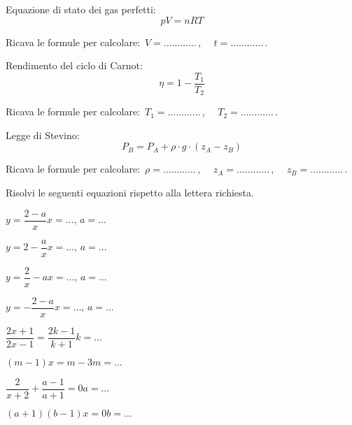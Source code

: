 \begin{esercizio}
\label{ese:20.65}
Equazione di stato dei gas perfetti:
\begin{equation*}
  pV=nRT
\end{equation*}

Ricava le formule per calcolare:~$V=\ldots\ldots\ldots\ldots$\,, $\quad 
t=\ldots\ldots\ldots\ldots$\,.
\end{esercizio}

\begin{esercizio}
\label{ese:20.66}
Rendimento del ciclo di Carnot:
\begin{equation*}
  \eta =1-\dfrac{T_{1}}{T_{2}}
\end{equation*}

Ricava le formule per calcolare:~$T_1=\ldots\ldots\ldots\ldots$\,, $\quad 
T_2=\ldots\ldots\ldots\ldots$\,.
\end{esercizio}

\begin{esercizio}
\label{ese:20.67}
Legge di Stevino:
\begin{equation*}
  P_{B}=P_{A}+\rho \cdot g\cdot (z_{A}-z_{B})
\end{equation*}

Ricava le formule per calcolare:~$\rho=\ldots\ldots\ldots\ldots$\,, $\quad 
z_A=\ldots\ldots\ldots\ldots$\,, $\quad z_B =\ldots\ldots\ldots\ldots$\,.
\end{esercizio}

\begin{esercizio}
\label{ese:20.68}
Risolvi le seguenti equazioni rispetto alla lettera richiesta.
\begin{multicols}{2}
\TabPositions{2.5cm}
\begin{enumeratea}
 \item $y=\dfrac{2-a}{x}$\tab$x=\ldots,\,a=\ldots$
 \item $y=2-\dfrac{a}{x}$\tab$x=\ldots,\,a=\ldots$
 \item $y=\dfrac{2}{x}-a$\tab$x=\ldots,\,a=\ldots$
 \item $y=-{\dfrac{2-a}{x}}$\tab$x=\ldots,\,a=\ldots$
 \item $\dfrac{2x+1}{2x-1}=\dfrac{2k-1}{k+1}$\tab$k=\ldots$
 \item $(m-1)x=m-3$\tab$m=\ldots$
 \item $\dfrac{2}{x+2}+\dfrac{a-1}{a+1}=0$\tab$a=\ldots$
 \item $(a+1)(b-1)x=0$\tab$b=\ldots$
\end{enumeratea}
\end{multicols}
\end{esercizio}

